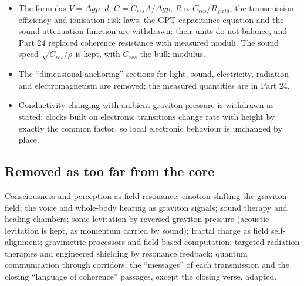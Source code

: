 \documentclass[11pt,a4paper]{article}
\begin{document}
\begin{itemize}
\item The formulas $V = \Delta gp\cdot d$, $C = C_{res}A/\Delta gp$, $R \propto C_{res}/R_{field}$, the transmission-efficiency and ionisation-risk laws, the GPT capacitance equation and the sound attenuation function are withdrawn: their units do not balance, and Part 24 replaced coherence resistance with measured moduli. The sound speed $\sqrt{C_{res}/\rho}$ is kept, with $C_{res}$ the bulk modulus.
\item The ``dimensional anchoring'' sections for light, sound, electricity, radiation and electromagnetism are removed; the measured quantities are in Part 24.
\item Conductivity changing with ambient graviton pressure is withdrawn as stated: clocks built on electronic transitions change rate with height by exactly the common factor, so local electronic behaviour is unchanged by place.
\end{itemize}
\subsection*{Removed as too far from the core}
Consciousness and perception as field resonance; emotion shifting the graviton field; the voice and whole-body hearing as graviton signals; sound therapy and healing chambers; sonic levitation by reversed graviton pressure (acoustic levitation is kept, as momentum carried by sound); fractal charge as field self-alignment; gravimetric processors and field-based computation; targeted radiation therapies and engineered shielding by resonance feedback; quantum communication through corridors; the ``messages'' of each transmission and the closing ``language of coherence'' passages, except the closing verse, adapted.
\end{document}
